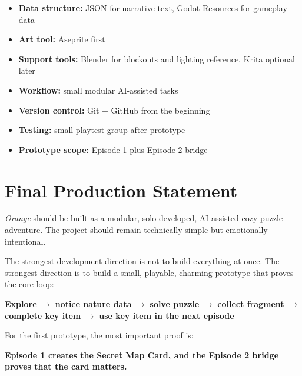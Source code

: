 \documentclass[12pt]{article}
\begin{document}
\begin{itemize}[leftmargin=*]
    \item \textbf{Data structure:} JSON for narrative text, Godot Resources for gameplay data
    \item \textbf{Art tool:} Aseprite first
    \item \textbf{Support tools:} Blender for blockouts and lighting reference, Krita optional later
    \item \textbf{Workflow:} small modular AI-assisted tasks
    \item \textbf{Version control:} Git + GitHub from the beginning
    \item \textbf{Testing:} small playtest group after prototype
    \item \textbf{Prototype scope:} Episode 1 plus Episode 2 bridge
\end{itemize}

\section{Final Production Statement}

\textit{Orange} should be built as a modular, solo-developed, AI-assisted cozy puzzle adventure. The project should remain technically simple but emotionally intentional.

The strongest development direction is not to build everything at once. The strongest direction is to build a small, playable, charming prototype that proves the core loop:

\begin{center}
\textbf{Explore} $\rightarrow$
\textbf{notice nature data} $\rightarrow$
\textbf{solve puzzle} $\rightarrow$
\textbf{collect fragment} $\rightarrow$
\textbf{complete key item} $\rightarrow$
\textbf{use key item in the next episode}
\end{center}

For the first prototype, the most important proof is:

\begin{center}
\textbf{Episode 1 creates the Secret Map Card, and the Episode 2 bridge proves that the card matters.}
\end{center}
\end{document}
